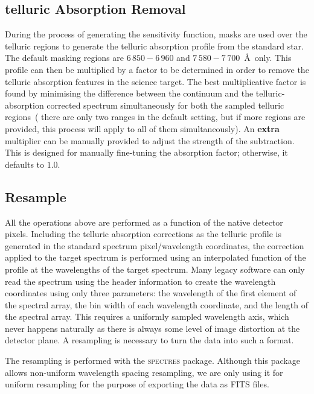 \documentclass[linenumbers, twocolumn]{aastex631}
\begin{document}
\subsection{telluric Absorption Removal}
During the process of generating the sensitivity function, masks are used
over the telluric regions to generate the telluric absorption
profile from the standard star. The default masking regions are $6\,850-6\,960$
and $7\,580-7\,700$\ \AA\ only. This profile can then be multiplied
by a factor to be determined in order to remove the telluric absorption
features in the science target. The best multiplicative factor is found
by minimising the difference between the continuum and the telluric-absorption
corrected spectrum simultaneously for both the sampled telluric regions~(
there are only two ranges in the default setting, but if more regions are
provided, this process will apply to all of them simultaneously).
An \textbf{extra} multiplier can be manually provided to adjust the
strength of the subtraction. This is designed for manually fine-tuning the
absorption factor; otherwise, it defaults to $1.0$.

\subsection{Resample}
All the operations above are performed as a function of the native detector
pixels. Including the telluric absorption corrections as the telluric profile
is generated in the standard spectrum pixel/wavelength coordinates, the
correction applied to the target spectrum is performed using an interpolated
function of the profile at the wavelengths of the target spectrum. Many legacy
software can only read the spectrum using the header information to create
the wavelength coordinates using only three parameters: the wavelength of the
first element of the spectral array, the bin width of each wavelength
coordinate, and the length of the spectral array. This requires a uniformly
sampled wavelength axis, which never happens naturally as there is always some
level of image distortion at the detector plane. A resampling is necessary
to turn the data into such a format.

The resampling is performed with the \textsc{spectres} package. Although
this package allows non-uniform wavelength spacing resampling, we are only
using it for uniform resampling for the purpose of exporting the data as FITS
files.
\end{document}
